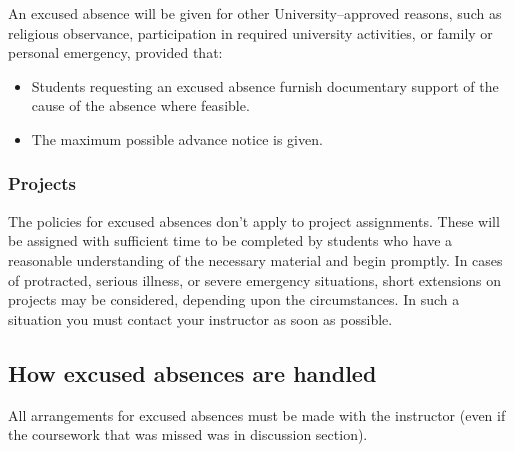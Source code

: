 \documentclass[10pt]{article}
\begin{document}
        An excused absence will be given for other University--approved reasons,
      such as religious observance, participation in required university
      activities, or family or personal emergency, provided that:

        \vspace{-2.5mm}

        \begin{itemize}

          \addtolength{\itemsep}{-1.75mm}

          \item Students requesting an excused absence furnish documentary
                support of the cause of the absence where feasible.

          \item The maximum possible advance notice is given.

        \end{itemize}

        \vspace{-4mm}

      \subsubsection{Projects\label{section:project-extension}}

        The policies for excused absences don't apply to project assignments.
      These will be assigned with sufficient time to be completed by
      students who have a reasonable understanding of the necessary material
      and begin promptly.  In cases of protracted, serious illness, or
      severe emergency situations, short extensions on projects may be
      considered, depending upon the circumstances.  In such a situation you
      must contact your instructor as soon as possible.


    \subsection{How excused absences are handled}

      All arrangements for excused absences must be made with the instructor
    (even if the coursework that was missed was in discussion section).
\end{document}
